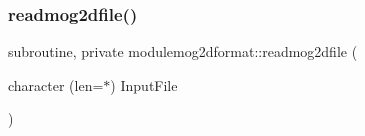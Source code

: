 \mbox{\label{namespacemodulemog2dformat_a49448dbf7a75da20faf8c9e64364c199}} 
\subsubsection{\texorpdfstring{readmog2dfile()}{readmog2dfile()}}
{\footnotesize\ttfamily subroutine, private modulemog2dformat\+::readmog2dfile (\begin{DoxyParamCaption}\item[{character (len=$\ast$)}]{Input\+File }\end{DoxyParamCaption})\hspace{0.3cm}{\ttfamily [private]}}


